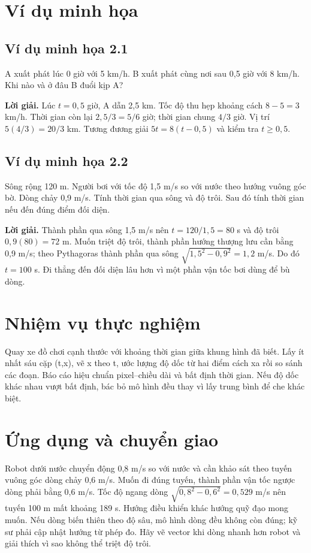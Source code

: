 \documentclass[11pt,a4paper,openany]{book}
\begin{document}
\section{Ví dụ minh họa}
\subsection*{Ví dụ minh họa 2.1}
A xuất phát lúc 0 giờ với 5 km/h. B xuất phát cùng nơi sau 0,5 giờ với 8 km/h. Khi nào và ở đâu B đuổi kịp A?

\textbf{Lời giải.} Lúc $t=0{,}5$ giờ, A dẫn 2,5 km. Tốc độ thu hẹp khoảng cách $8-5=3$ km/h. Thời gian còn lại $2{,}5/3=5/6$ giờ; thời gian chung $4/3$ giờ. Vị trí $5(4/3)=20/3$ km. Tương đương giải $5t=8(t-0{,}5)$ và kiểm tra $t\ge0{,}5$.
\subsection*{Ví dụ minh họa 2.2}
Sông rộng 120 m. Người bơi với tốc độ 1,5 m/s so với nước theo hướng vuông góc bờ. Dòng chảy 0,9 m/s. Tính thời gian qua sông và độ trôi. Sau đó tính thời gian nếu đến đúng điểm đối diện.

\textbf{Lời giải.} Thành phần qua sông 1,5 m/s nên $t=120/1{,}5=80$ s và độ trôi $0{,}9(80)=72$ m. Muốn triệt độ trôi, thành phần hướng thượng lưu cần bằng 0,9 m/s; theo Pythagoras thành phần qua sông $\sqrt{1{,}5^2-0{,}9^2}=1{,}2$ m/s. Do đó $t=100$ s. Đi thẳng đến đối diện lâu hơn vì một phần vận tốc bơi dùng để bù dòng.
\section{Nhiệm vụ thực nghiệm}
Quay xe đồ chơi cạnh thước với khoảng thời gian giữa khung hình đã biết. Lấy ít nhất sáu cặp (t,x), vẽ x theo t, ước lượng độ dốc từ hai điểm cách xa rồi so sánh các đoạn. Báo cáo hiệu chuẩn pixel–chiều dài và bất định thời gian. Nếu độ dốc khác nhau vượt bất định, bác bỏ mô hình đều thay vì lấy trung bình để che khác biệt.
\section{Ứng dụng và chuyển giao}
Robot dưới nước chuyển động 0,8 m/s so với nước và cần khảo sát theo tuyến vuông góc dòng chảy 0,6 m/s. Muốn đi đúng tuyến, thành phần vận tốc ngược dòng phải bằng 0,6 m/s. Tốc độ ngang dòng $\sqrt{0{,}8^2-0{,}6^2}=0{,}529$ m/s nên tuyến 100 m mất khoảng 189 s. Hướng điều khiển khác hướng quỹ đạo mong muốn. Nếu dòng biến thiên theo độ sâu, mô hình dòng đều không còn đúng; kỹ sư phải cập nhật hướng từ phép đo. Hãy vẽ vector khi dòng nhanh hơn robot và giải thích vì sao không thể triệt độ trôi.
\end{document}

